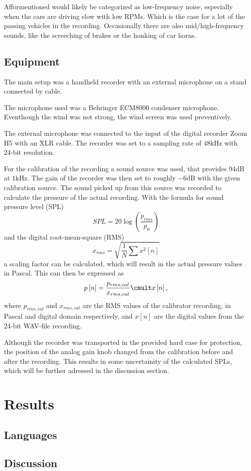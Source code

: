 \documentclass[twocolumn]{article}
\begin{document}
Afformentioned would likely be categorized as low-frequency noise, especially when the cars are driving slow
with low RPMs.
Which is the case for a lot of the passing vehicles in the recording.
Occasionally there are also mid/high-frequency sounds, like the screeching of brakes or the honking of car horns.

\subsection{Equipment}
The main setup was a handheld recorder with an external microphone on a stand connected by cable.

The microphone used was a Behringer ECM8000 condenser microphone.
Eventhough the wind was not strong, the wind screen was used preventively.

The external microphone was connected to the input of the digital recorder Zoom H5 with an XLR cable.
The recorder was set to a sampling rate of $48\textrm{kHz}$ with 24-bit resolution.

For the calibration of the recording a sound source was used, that provides 94dB at $1\textrm{kHz}$.
The gain of the recorder was then set to roughly $-6\textrm{dB}$ with the given calibration source.
The sound picked up from this source was recorded to calculate the pressure of the actual recording.
With the formula for sound pressure level (SPL)
\begin{equation}
    SPL = 20\log\left(\frac{p_{rms}}{p_0}\right)
\end{equation}
and the digital root-mean-square (RMS)
\begin{equation}
    x_{rms} = \sqrt{\frac{1}{N}\sum x^2\left[n\right]}
\end{equation}
a scaling factor can be calculated, which will result in the actual pressure values in Pascal.
This can then be expressed as
\begin{equation}
    p\left[n\right] = \frac{p_{rms,cal}}{x_{rms,cal}}\cmult x\left[n\right]\textrm{,}
\end{equation}
where $p_{rms,cal}$ and $x_{rms,cal}$ are the RMS values of the calibrator recording, in Pascal and digital
domain respectively, and $x\left[n\right]$ are the digital values from the 24-bit WAV-file recording.

Although the recorder was transported in the provided hard case for protection, the position of the analog gain
knob changed from the calibration before and after the recording.
This results in some uncertainity of the calculated SPLs, which will be further adressed in the discussion
section.

\section{Results}
\subsection{Languages}

\subsection{Discussion}
\end{document}

